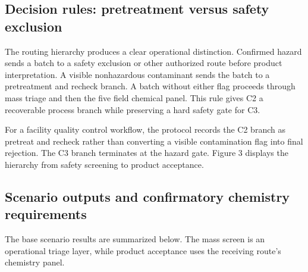 \documentclass[pdflatex,sn-basic]{sn-jnl}
\begin{document}
\subsection{Decision rules: pretreatment versus safety exclusion}\label{decision-rules-pretreatment-versus-safety-exclusion}

The routing hierarchy produces a clear operational distinction. Confirmed hazard sends a batch to a safety exclusion or other authorized route before product interpretation. A visible nonhazardous contaminant sends the batch to a pretreatment and recheck branch. A batch without either flag proceeds through mass triage and then the five field chemical panel. This rule gives C2 a recoverable process branch while preserving a hard safety gate for C3.

For a facility quality control workflow, the protocol records the C2 branch as pretreat and recheck rather than converting a visible contamination flag into final rejection. The C3 branch terminates at the hazard gate. Figure 3 displays the hierarchy from safety screening to product acceptance.

\subsection{Scenario outputs and confirmatory chemistry requirements}\label{scenario-outputs-and-confirmatory-chemistry-requirements}

The base scenario results are summarized below. The mass screen is an operational triage layer, while product acceptance uses the receiving route's chemistry panel.
\end{document}
